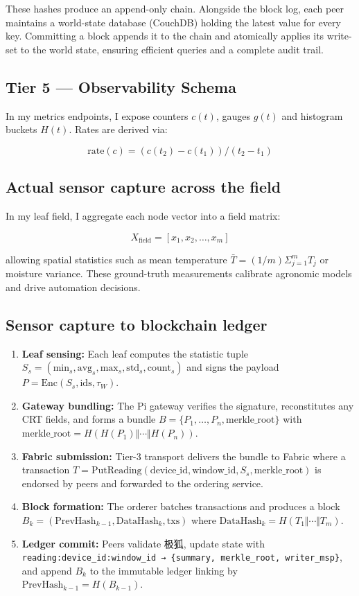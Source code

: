\documentclass[12pt]{article}
\begin{document}
These hashes produce an append-only chain. Alongside the block log, each peer maintains a world-state database (CouchDB) holding the latest value for every key. Committing a block appends it to the chain and atomically applies its write-set to the world state, ensuring efficient queries and a complete audit trail.

\subsection{Tier 5 — Observability Schema}
In my metrics endpoints, I expose counters \(c(t)\), gauges \(g(t)\) and histogram buckets \(H(t)\). Rates are derived via:

\[
\text{rate}(c) = (c(t_2) - c(t_1)) / (t_2 - t_1)
\]

\subsection{Actual sensor capture across the field}
In my leaf field, I aggregate each node vector into a field matrix:

\[
X_{\text{field}} = [x_1, x_2, \ldots, x_m]
\]

allowing spatial statistics such as mean temperature \(\bar{T} = (1/m) \Sigma_{j=1}^m T_j\) or moisture variance. These ground-truth measurements calibrate agronomic models and drive automation decisions.

\subsection{Sensor capture to blockchain ledger}

\begin{enumerate}
\item \textbf{Leaf sensing:} Each leaf computes the statistic tuple
   \(S_s = (\text{min}_s,\text{avg}_s,\text{max}_s,\text{std}_s,\text{count}_s)\)
   and signs the payload \(P = \text{Enc}(S_s,\text{ids},\tau_W)\).
\item \textbf{Gateway bundling:} The Pi gateway verifies the signature, reconstitutes any CRT fields, and forms a bundle
   \(B = \{P_1,\ldots,P_n, \text{merkle\_root}\}\) with
   \(\text{merkle\_root} = H(H(P_1) \Vert \cdots \Vert H(P_n))\).
\item \textbf{Fabric submission:} Tier-3 transport delivers the bundle to Fabric where a transaction
   \(T = \text{PutReading}(\text{device\_id},\text{window\_id},S_s,\text{merkle\_root})\)
   is endorsed by peers and forwarded to the ordering service.
\item \textbf{Block formation:} The orderer batches transactions and produces a block
   \(B_k = (\text{PrevHash}_{k-1},\text{DataHash}_k,\text{txs})\)
   where \(\text{DataHash}_k = H(T_1 \Vert \cdots \Vert T_m)\).
\item \textbf{Ledger commit:} Peers validate \(极狐\), update state with
   \texttt{reading:device\_id:window\_id → \{summary, merkle\_root, writer\_msp\}},
   and append \(B_k\) to the immutable ledger linking by
   \(\text{PrevHash}_{k-1} = H(B_{k-1})\).
\end{enumerate}
\end{document}
